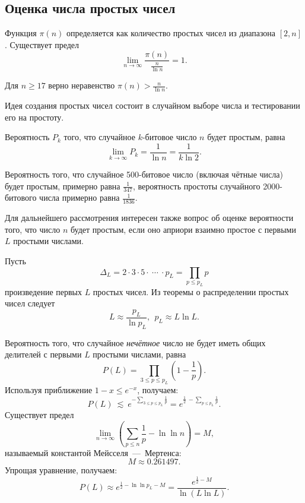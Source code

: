 \subsection{Оценка числа простых чисел}

Функция $\pi(n)$ определяется как количество простых чисел из диапазона $[2, n]$.
Существует предел~\cite{Selberg:1949}
    \[ \lim\limits_{n \rightarrow \infty}\frac{ \pi(n)}{ \frac{n}{\ln n}}=1. \]

Для $n \geq 17$ верно неравенство $\pi(n) > \frac{n}{\ln n}$.

Идея создания простых чисел состоит в случайном выборе числа и тестировании его на простоту.

Вероятность $P_k$ того, что случайное $k$-битовое число $n$ будет простым, равна
    \[ \lim\limits_{k \rightarrow \infty} P_k = \frac{1}{\ln n} = \frac{1}{k \ln 2}. \]

\example
    Вероятность того, что случайное 500-битовое число (включая чётные числа) будет простым, примерно равна $\frac{1}{347}$, вероятность простоты случайного 2000-битового числа примерно равна $\frac{1}{1836}$.
\exampleend

Для дальнейшего рассмотрения интересен также вопрос об оценке вероятности того, что число $n$ будет простым, если оно априори взаимно простое с первыми $L$ простыми числами.

Пусть
    \[ \Delta_L = 2 \cdot 3 \cdot 5 \cdot ~\cdots~ \cdot p_L = \prod \limits_{p \leq p_L} p \]
произведение первых $L$ простых чисел. Из теоремы о распределении простых чисел следует
    \[ L \approx \frac{p_L}{\ln p_L}, ~~ p_L \approx L \ln L. \]

Вероятность того, что случайное \textit{нечётное} число не будет иметь общих делителей с первыми $L$ простыми числами, равна
    \[ P(L) = \prod \limits_{3 \leq p \leq p_L} \left( 1 - \frac{1}{p} \right). \]
Используя приближение $1-x \leq e^{-x}$, получаем:
    \[ P(L) ~\lesssim~ e^{-\sum\limits_{3 \leq p \leq p_L} \frac{1}{p}} = e^{\frac{1}{2} ~ - \sum\limits_{p \leq p_L} \frac{1}{p}}. \]
Существует предел
    \[ \lim \limits_{n \rightarrow \infty} \left( \sum \limits_{p \leq n} \frac{1}{p} - \ln \ln n \right) = M, \]
называемый константой Мейсселя~---~Мертенса:
    \[ M \approx 0.261497. \]
Упрощая уравнение, получаем:
    \[ P(L) \approx e^{\frac{1}{2} - \ln \ln p_L - M} = \frac{e^{\frac{1}{2} - M}}{\ln(L \ln L)}. \]

